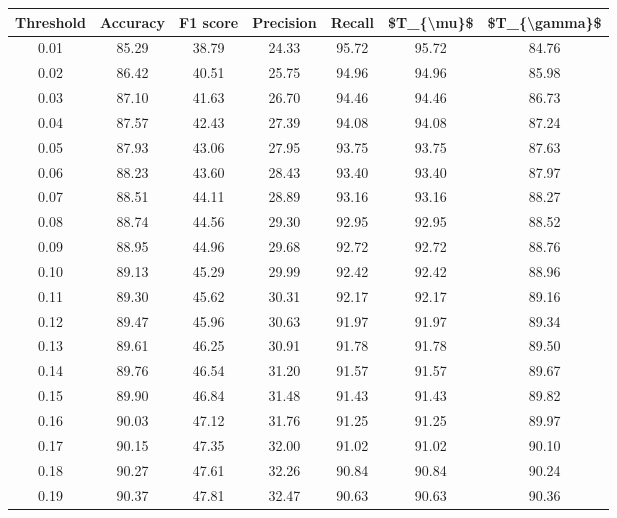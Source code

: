 \begin{tabular}{|c|c|c|c|c|c|c|}
\hline
 Threshold &  Accuracy &  F1 score &  Precision &  Recall &  \$T\_\{\textbackslash mu\}\$ &  \$T\_\{\textbackslash gamma\}\$ \\
\hline
      0.01 &     85.29 &     38.79 &      24.33 &   95.72 &      95.72 &         84.76 \\
      0.02 &     86.42 &     40.51 &      25.75 &   94.96 &      94.96 &         85.98 \\
      0.03 &     87.10 &     41.63 &      26.70 &   94.46 &      94.46 &         86.73 \\
      0.04 &     87.57 &     42.43 &      27.39 &   94.08 &      94.08 &         87.24 \\
      0.05 &     87.93 &     43.06 &      27.95 &   93.75 &      93.75 &         87.63 \\
      0.06 &     88.23 &     43.60 &      28.43 &   93.40 &      93.40 &         87.97 \\
      0.07 &     88.51 &     44.11 &      28.89 &   93.16 &      93.16 &         88.27 \\
      0.08 &     88.74 &     44.56 &      29.30 &   92.95 &      92.95 &         88.52 \\
      0.09 &     88.95 &     44.96 &      29.68 &   92.72 &      92.72 &         88.76 \\
      0.10 &     89.13 &     45.29 &      29.99 &   92.42 &      92.42 &         88.96 \\
      0.11 &     89.30 &     45.62 &      30.31 &   92.17 &      92.17 &         89.16 \\
      0.12 &     89.47 &     45.96 &      30.63 &   91.97 &      91.97 &         89.34 \\
      0.13 &     89.61 &     46.25 &      30.91 &   91.78 &      91.78 &         89.50 \\
      0.14 &     89.76 &     46.54 &      31.20 &   91.57 &      91.57 &         89.67 \\
      0.15 &     89.90 &     46.84 &      31.48 &   91.43 &      91.43 &         89.82 \\
      0.16 &     90.03 &     47.12 &      31.76 &   91.25 &      91.25 &         89.97 \\
      0.17 &     90.15 &     47.35 &      32.00 &   91.02 &      91.02 &         90.10 \\
      0.18 &     90.27 &     47.61 &      32.26 &   90.84 &      90.84 &         90.24 \\
      0.19 &     90.37 &     47.81 &      32.47 &   90.63 &      90.63 &         90.36 \\

\end{tabular}
